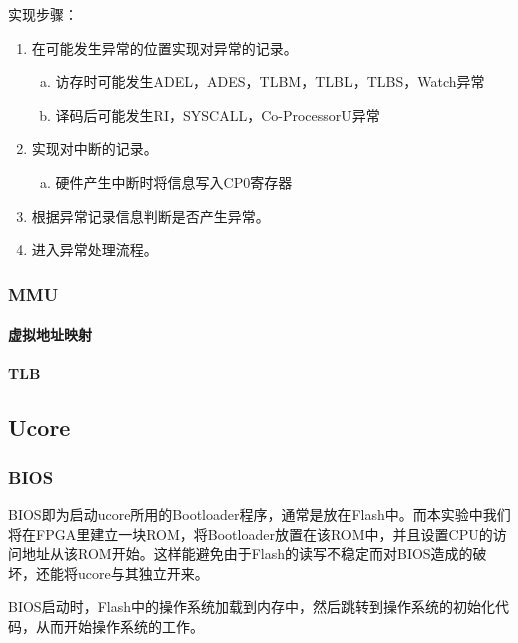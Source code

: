 \qquad 

实现步骤：

\begin{enumerate}[(1)]
\item 在可能发生异常的位置实现对异常的记录。

\begin{enumerate}[(a)]
\item 访存时可能发生ADEL，ADES，TLBM，TLBL，TLBS，Watch异常

\item 译码后可能发生RI，SYSCALL，Co-ProcessorU异常
\end{enumerate}
\item 实现对中断的记录。

\begin{enumerate}[(a)]
\item 硬件产生中断时将信息写入CP0寄存器
\end{enumerate}

\item 根据异常记录信息判断是否产生异常。

\item 进入异常处理流程。

\end{enumerate}

\subsubsection{MMU}
\paragraph{虚拟地址映射}
\paragraph{TLB}

\subsection{Ucore}
\subsubsection{BIOS}
BIOS即为启动ucore所用的Bootloader程序，通常是放在Flash中。而本实验中我们将在FPGA里建立一块ROM，将Bootloader放置在该ROM中，并且设置CPU的访问地址从该ROM开始。这样能避免由于Flash的读写不稳定而对BIOS造成的破坏，还能将ucore与其独立开来。

BIOS启动时，Flash中的操作系统加载到内存中，然后跳转到操作系统的初始化代码，从而开始操作系统的工作。
